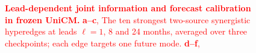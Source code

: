 \documentclass[fleqn,10pt]{wlscirep}
\newcommand{\rev}[1]{\textcolor{red}{#1}}
\theoremstyle{naturetheorem}
\begin{document}
\begin{figure}[p]
\caption{\rev{\textbf{Lead-dependent joint information and forecast calibration in frozen UniCM.} \textbf{a--c}, The ten strongest two-source synergistic hyperedges at leads $\ell=1$, 8 and 24 months, averaged over three checkpoints; each edge targets one future mode. \textbf{d--f}, %
}}
\end{figure}
\end{document}

